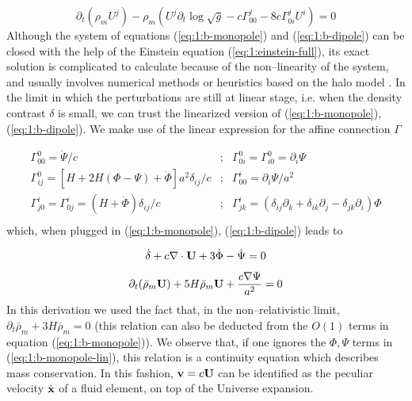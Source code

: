 \begin{equation}
\label{eq:1:b-dipole}
\partial_t(\rho_m U^j) - \rho_m (U^j\partial_t\log \sqrt{g} - c\Gamma^j_{00} - 8c\Gamma_{0i}^jU^i) = 0 
\end{equation}
%
Although the system of equations (\ref{eq:1:b-monopole}) and (\ref{eq:1:b-dipole}) can be closed with the help of the Einstein equation (\ref{eq:1:einstein-full}), its exact solution is complicated to calculate because of the non--linearity of the system, and usually involves numerical methods \citep{gadget2} or heuristics based on the halo model \citep{HaloModel}. In the limit in which the perturbations are still at linear stage, i.e. when the density contrast $\delta$ is small, we can trust the linearized version of (\ref{eq:1:b-monopole}), (\ref{eq:1:b-dipole}). We make use of the linear expression for the affine connection $\Gamma$

\begin{equation}
\label{eq:1:connection}
\begin{matrix}
\Gamma_{00}^0 = \dot{\Psi}/c & ; & \Gamma_{0i}^0=\Gamma_{i0}^0 = \partial_i\Psi \\  
\Gamma_{ij}^0 = [H+2H(\Phi-\Psi)+\dot{\Phi}]a^2\delta_{ij}/c & ; & \Gamma_{00}^i = \partial_i \Psi/a^2 \\
\Gamma^i_{j0} = \Gamma^i_{0j} = (H+\dot{\Phi})\delta_{ij}/c & ; & \Gamma_{jk}^i = (\delta_{ij}\partial_k+\delta_{ik}\partial_j-\delta_{jk}\partial_i)\Phi\\
\end{matrix}
\end{equation}
%
which, when plugged in (\ref{eq:1:b-monopole}), (\ref{eq:1:b-dipole}) leads to

\begin{equation}
\label{eq:1:b-monopole-lin}
\dot{\delta} + c \nabla\cdot \mathbf{U} + 3\dot{\Phi} - \dot{\Psi} = 0
\end{equation}

\begin{equation}
\label{eq:1:b-dipole-lin}
\partial_t(\bar{\rho}_m\mathbf{U}) + 5H\bar{\rho}_m\mathbf{U} + \frac{c\nabla\Psi}{a^2} = 0
\end{equation}
%
In this derivation we used the fact that, in the non--relativistic limit, $\partial_t\bar{\rho}_m + 3H\bar{\rho}_m=0$ (this relation can also be deducted from the $O(1)$ terms in equation (\ref{eq:1:b-monopole})). We observe that, if one ignores the $\Phi,\Psi$ terms in (\ref{eq:1:b-monopole-lin}), this relation is a continuity equation which describes mass conservation. In this fashion, $\mathbf{v}=c\mathbf{U}$ can be identified as the peculiar velocity $\dot{\mathbf{x}}$ of a fluid element, on top of the Universe expansion. 

